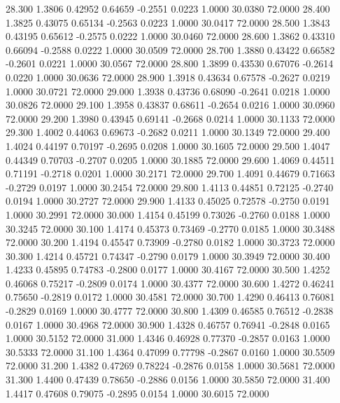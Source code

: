   28.300   1.3806   0.42952   0.64659  -0.2551   0.0223   1.0000  30.0380  72.0000
  28.400   1.3825   0.43075   0.65134  -0.2563   0.0223   1.0000  30.0417  72.0000
  28.500   1.3843   0.43195   0.65612  -0.2575   0.0222   1.0000  30.0460  72.0000
  28.600   1.3862   0.43310   0.66094  -0.2588   0.0222   1.0000  30.0509  72.0000
  28.700   1.3880   0.43422   0.66582  -0.2601   0.0221   1.0000  30.0567  72.0000
  28.800   1.3899   0.43530   0.67076  -0.2614   0.0220   1.0000  30.0636  72.0000
  28.900   1.3918   0.43634   0.67578  -0.2627   0.0219   1.0000  30.0721  72.0000
  29.000   1.3938   0.43736   0.68090  -0.2641   0.0218   1.0000  30.0826  72.0000
  29.100   1.3958   0.43837   0.68611  -0.2654   0.0216   1.0000  30.0960  72.0000
  29.200   1.3980   0.43945   0.69141  -0.2668   0.0214   1.0000  30.1133  72.0000
  29.300   1.4002   0.44063   0.69673  -0.2682   0.0211   1.0000  30.1349  72.0000
  29.400   1.4024   0.44197   0.70197  -0.2695   0.0208   1.0000  30.1605  72.0000
  29.500   1.4047   0.44349   0.70703  -0.2707   0.0205   1.0000  30.1885  72.0000
  29.600   1.4069   0.44511   0.71191  -0.2718   0.0201   1.0000  30.2171  72.0000
  29.700   1.4091   0.44679   0.71663  -0.2729   0.0197   1.0000  30.2454  72.0000
  29.800   1.4113   0.44851   0.72125  -0.2740   0.0194   1.0000  30.2727  72.0000
  29.900   1.4133   0.45025   0.72578  -0.2750   0.0191   1.0000  30.2991  72.0000
  30.000   1.4154   0.45199   0.73026  -0.2760   0.0188   1.0000  30.3245  72.0000
  30.100   1.4174   0.45373   0.73469  -0.2770   0.0185   1.0000  30.3488  72.0000
  30.200   1.4194   0.45547   0.73909  -0.2780   0.0182   1.0000  30.3723  72.0000
  30.300   1.4214   0.45721   0.74347  -0.2790   0.0179   1.0000  30.3949  72.0000
  30.400   1.4233   0.45895   0.74783  -0.2800   0.0177   1.0000  30.4167  72.0000
  30.500   1.4252   0.46068   0.75217  -0.2809   0.0174   1.0000  30.4377  72.0000
  30.600   1.4272   0.46241   0.75650  -0.2819   0.0172   1.0000  30.4581  72.0000
  30.700   1.4290   0.46413   0.76081  -0.2829   0.0169   1.0000  30.4777  72.0000
  30.800   1.4309   0.46585   0.76512  -0.2838   0.0167   1.0000  30.4968  72.0000
  30.900   1.4328   0.46757   0.76941  -0.2848   0.0165   1.0000  30.5152  72.0000
  31.000   1.4346   0.46928   0.77370  -0.2857   0.0163   1.0000  30.5333  72.0000
  31.100   1.4364   0.47099   0.77798  -0.2867   0.0160   1.0000  30.5509  72.0000
  31.200   1.4382   0.47269   0.78224  -0.2876   0.0158   1.0000  30.5681  72.0000
  31.300   1.4400   0.47439   0.78650  -0.2886   0.0156   1.0000  30.5850  72.0000
  31.400   1.4417   0.47608   0.79075  -0.2895   0.0154   1.0000  30.6015  72.0000
